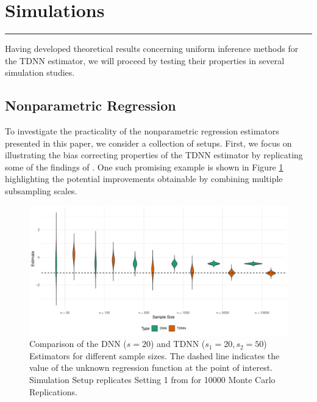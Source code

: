 \section{Simulations}\label{sec:simulations}
\hrule

Having developed theoretical results concerning uniform inference methods for the TDNN estimator, we will proceed by testing their properties in several simulation studies.

\subsection{Nonparametric Regression}
To investigate the practicality of the nonparametric regression estimators presented in this paper, we consider a collection of setups.
First, we focus on illustrating the bias correcting properties of the TDNN estimator by replicating some of the findings of \citet{demirkaya_optimal_2024}.
One such promising example is shown in Figure \ref{fig:TDNN_bias_cor} highlighting the potential improvements obtainable by combining multiple subsampling scales.
\begin{figure}[H]
	\centering
	\includegraphics[width = \textwidth]{../Code/Simulations/Graphics/TDNN_DNN.pdf}
	\caption{Comparison of the DNN ($s = 20$) and TDNN ($s_1 = 20, s_2 = 50$) Estimators for different sample sizes.
		The dashed line indicates the value of the unknown regression function at the point of interest.
		Simulation Setup replicates Setting 1 from \citet{demirkaya_optimal_2024} for 10000 Monte Carlo Replications.}
	\label{fig:TDNN_bias_cor}
\end{figure}

